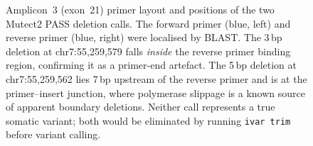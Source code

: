 \begin{figure}[H]
\caption{Amplicon~3 (exon~21) primer layout and positions of the two Mutect2
  PASS deletion calls. The forward primer (blue, left) and reverse primer (blue,
  right) were localised by BLAST. The 3\,bp deletion at chr7:55{,}259{,}579
  falls \emph{inside} the reverse primer binding region, confirming it as a
  primer-end artefact. The 5\,bp deletion at chr7:55{,}259{,}562 lies 7\,bp
  upstream of the reverse primer and is at the primer--insert junction, where
  polymerase slippage is a known source of apparent boundary deletions. Neither
  call represents a true somatic variant; both would be eliminated by running
  \texttt{ivar trim} before variant calling.}
\label{fig:exon21-primer-artefact}
\end{figure}
